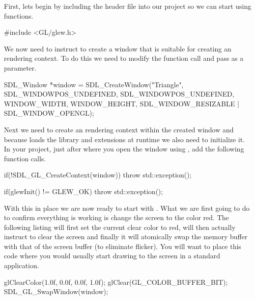 \documentclass[10pt]{article}
\begin{document}
First, lets begin by including the  header file into our
project so we can start using  functions.

\begin{Code}
  #include <GL/glew.h>
\end{Code}

We now need to instruct  to create a window that is
suitable for creating an  rendering context. To do this
we need to modify the  function call and pass
 as a parameter.

\begin{Code}
  SDL_Window *window = SDL_CreateWindow("Triangle",
    SDL_WINDOWPOS_UNDEFINED, SDL_WINDOWPOS_UNDEFINED,
    WINDOW_WIDTH, WINDOW_HEIGHT,
    SDL_WINDOW_RESIZABLE | SDL_WINDOW_OPENGL);
\end{Code}

Next we need to create an  rendering context within
the created  window and because  loads the
 library and extensions at runtime we also need to initialize
it. In your project, just after where you open the  window
using , add the following function calls.

\begin{Code}
  if(!SDL_GL_CreateContext(window))
  {
    throw std::exception();
  }

  if(glewInit() != GLEW_OK)
  {
    throw std::exception();
  }
\end{Code}


With this in place we are now ready to start with . What
we are first going to do to confirm everything is working is change
the screen to the color red. The following listing will first set the
current  clear color to red, will then actually instruct
 to clear the screen and finally it will atomically swap the
 memory buffer with that of the screen buffer (to eliminate
flicker). You will want to place this code where you would usually start
drawing to the screen in a standard  application.

\begin{Code}
  glClearColor(1.0f, 0.0f, 0.0f, 1.0f);
  glClear(GL_COLOR_BUFFER_BIT);
  SDL_GL_SwapWindow(window);
\end{Code}
\end{document}
